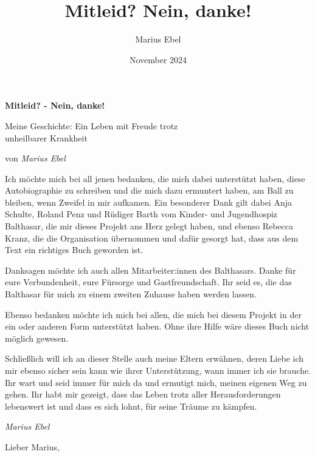 \documentclass[fontsize=14pt,a4paper,headinclude,DIV=calc,automark]{scrbook}
\title{Mitleid? Nein, danke!}
\author{Marius Ebel}
\date{November 2024}
\begin{document}
\frontmatter

\thispagestyle{empty}

\vspace*{\fill}
\begin{center}
    \huge\bfseries Mitleid? - Nein, danke!\par
    \vspace{1cm}
    \large Meine Geschichte: Ein Leben mit Freude trotz\\ unheilbarer Krankheit\par
    \vspace{1cm}
    \normalsize von \textit{Marius Ebel}\par
\end{center}
\vspace*{\fill}

\pagestyle{plain}
\vspace{-1\baselineskip}

Ich möchte mich bei all jenen bedanken, die mich dabei unterstützt haben, diese Autobiographie zu schreiben und die mich dazu ermuntert haben, am Ball zu bleiben, wenn Zweifel in mir aufkamen.
Ein besonderer Dank gilt dabei Anja Schulte, Roland Penz und Rüdiger Barth vom Kinder- und Jugendhospiz Balthasar, die mir dieses Projekt ans Herz gelegt haben, und ebenso Rebecca Kranz, die die Organisation übernommen und dafür gesorgt hat, dass aus dem Text ein richtiges Buch geworden ist.

Danksagen möchte ich auch allen Mitarbeiter:innen des Balthasars. Danke für eure Verbundenheit, eure Fürsorge und Gastfreundschaft. Ihr seid es, die das Balthasar für mich zu einem zweiten Zuhause haben werden lassen.

Ebenso bedanken möchte ich mich bei allen, die mich bei diesem Projekt in der ein oder anderen Form unterstützt haben. Ohne ihre Hilfe wäre dieses Buch nicht möglich gewesen.

Schließlich will ich an dieser Stelle auch meine Eltern erwähnen, deren Liebe ich mir ebenso sicher sein kann wie ihrer Unterstützung, wann immer ich sie brauche. Ihr wart und seid immer für mich da und ermutigt mich, meinen eigenen Weg zu gehen. Ihr habt mir gezeigt, dass das Leben trotz aller Herausforderungen lebenswert ist und dass es sich lohnt, für seine Träume zu kämpfen.

\vspace{0.5cm}
\noindent\textit{Marius Ebel}

\vspace{-1\baselineskip}
Lieber Marius,\par
\vspace{0\baselineskip}
\end{document}
